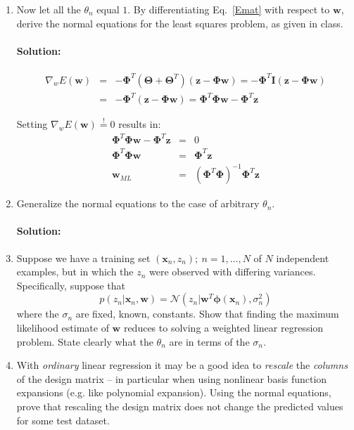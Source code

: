 \documentclass{article}
\renewcommand{\Vec}[1]{\ensuremath{\mathbf{#1}}}
\newcommand{\Mtx}[1]{\ensuremath{\mathbf{#1}}}
\begin{document}
\begin{enumerate}
\item Now let all the $\theta_n$ equal $1$. By differentiating Eq.\ \ref{Emat} 
with respect to \Vec{w}, derive the normal equations for the least squares problem, 
as given in class. 

\paragraph*{Solution:}
\begin{eqnarray}
\nabla_w E(\Vec{w}) &=& -\Mtx{\Phi}^T (\Mtx{\Theta} + \Mtx{\Theta}^T) (\Vec{z}-\Mtx{\Phi} \Vec{w}) = -\Mtx{\Phi}^T \Mtx{I} (\Vec{z}-\Mtx{\Phi} \Vec{w})\\
&=& -\Mtx{\Phi}^T (\Vec{z}-\Mtx{\Phi} \Vec{w}) = \Mtx{\Phi}^T \Mtx{\Phi} \Vec{w} - \Mtx{\Phi}^T \Vec{z}
\end{eqnarray}

Setting $\nabla_w E(\Vec{w}) \overset{!}{=} 0$ results in:
\begin{eqnarray}
\Mtx{\Phi}^T \Mtx{\Phi} \Vec{w} - \Mtx{\Phi}^T \Vec{z} &=& 0\\
\Mtx{\Phi}^T \Mtx{\Phi} \Vec{w} &=& \Mtx{\Phi}^T \Vec{z}\\
\Vec{w}_{ML} &=& (\Mtx{\Phi}^T \Mtx{\Phi})^{-1}\Mtx{\Phi}^T \Vec{z}
\end{eqnarray}


\item Generalize the normal equations to the case of arbitrary $\theta_n$.

\paragraph*{Solution:}


\item Suppose we have a training set ${(\Vec{x}_n, z_n);\ n = 1, \dots ,N}$ 
of $N$ independent examples, but in which the $z_n$ were observed with differing 
variances. Specifically, suppose that
\[
p(z_n|\Vec{x}_n,\Vec{w}) = \mathcal{N}(z_n|\Vec{w}^{T}\Vec{\phi}(\Vec{x}_n),\sigma_n^2)
\]
where the $\sigma_n$ are fixed, known, constants. Show that finding the maximum 
likelihood estimate of $\Vec{w}$ reduces to solving a weighted linear regression problem. 
State clearly what the $\theta_n$ are in terms of the $\sigma_n$.

\item With \emph{ordinary} linear regression it may be a good idea to \emph{rescale} the
\emph{columns} of the design matrix -- in particular when using nonlinear basis function
expansions (e.g. like polynomial expansion). Using the normal equations, prove that rescaling
the design matrix does not change the predicted values for some test dataset.
\end{enumerate}
\end{document}

